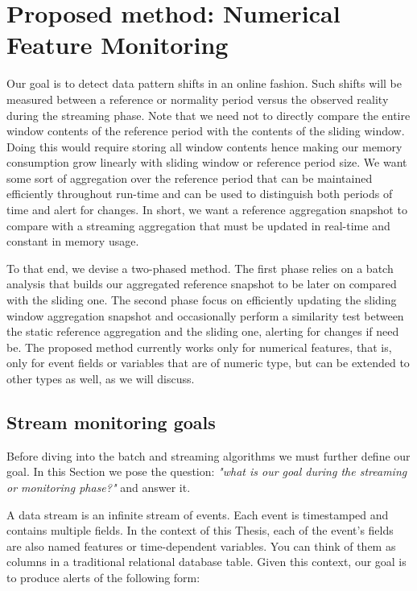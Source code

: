 \section{Proposed method: Numerical Feature Monitoring}

Our goal is to detect data pattern shifts in an online fashion. Such shifts will be measured between a reference or normality period versus the observed reality during the streaming phase. Note that we need not to directly compare the entire window contents of the reference period with the contents of the sliding window. Doing this would require storing all window contents hence making our memory consumption grow linearly with sliding window or reference period size. We want some sort of aggregation over the reference period that can be maintained efficiently throughout run-time and can be used to distinguish both periods of time and alert for changes. In short, we want a reference aggregation snapshot to compare with a streaming aggregation that must be updated in real-time and constant in memory usage.

To that end, we devise a two-phased method. The first phase relies on a batch analysis that builds our aggregated reference snapshot to be later on compared with the sliding one. The second phase focus on efficiently updating the sliding window aggregation snapshot and occasionally perform a similarity test between the static reference aggregation and the sliding one, alerting for changes if need be. The proposed method currently works only for numerical features, that is, only for event fields or variables that are of numeric type, but can be extended to other types as well, as we will discuss.

\subsection{Stream monitoring goals}
Before diving into the batch and streaming algorithms we must further define our goal. In this Section we pose the question: \textit{"what is our goal during the streaming or monitoring phase?"} and answer it.

A data stream is an infinite stream of events. Each event is timestamped and contains multiple fields. In the context of this Thesis, each of the event's fields are also named features or time-dependent variables. You can think of them as columns in a traditional relational database table. Given this context, our goal is to produce alerts of the following form:

